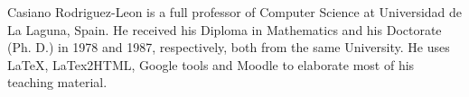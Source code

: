 Casiano Rodriguez-Leon is a full professor of Computer Science
at Universidad de La Laguna, Spain. He received his Diploma in 
Mathematics and his Doctorate (Ph. D.) in 1978 and 1987, respectively,
both from the same University. 
He uses LaTeX, LaTex2HTML, Google tools and Moodle to elaborate
most of his teaching material.


